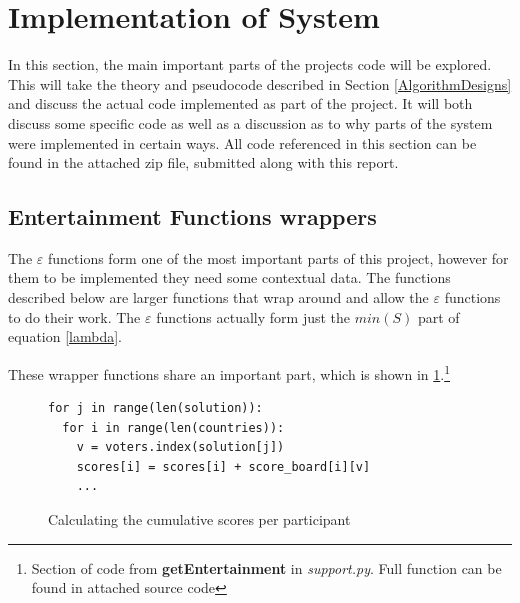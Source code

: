 \documentclass[12pt]{report}
\begin{document}
\section{Implementation of System}\label{Implementation}
In this section, the main important parts of the projects code will be explored. This will take the theory and pseudocode described in Section \ref{AlgorithmDesigns} and discuss the actual code implemented as part of the project. It will both discuss some specific code as well as a discussion as to why parts of the system were implemented in certain ways. All code referenced in this section can be found in the attached zip file, submitted along with this report.

\subsection{Entertainment Functions wrappers}\label{Imp-Ewrappers}
The $\varepsilon$ functions form one of the most important parts of this project, however for them to be implemented they need some contextual data. The functions described below are larger functions that wrap around and allow the $\varepsilon$ functions to do their work. The $\varepsilon$ functions actually form just the $min(S)$ part of equation \ref{lambda}. 

These wrapper functions share an important part, which is shown in \ref{findScores}.\footnote{Section of code from \textbf{getEntertainment} in \textit{support.py}. Full function can be found in attached source code}

\begin{figure}[H]
\caption{Calculating the cumulative scores per participant}
\label{findScores}
\begin{lstlisting}
for j in range(len(solution)):
  for i in range(len(countries)):
    v = voters.index(solution[j])
    scores[i] = scores[i] + score_board[i][v]
    ...
\end{lstlisting}
\end{figure}
\end{document}
